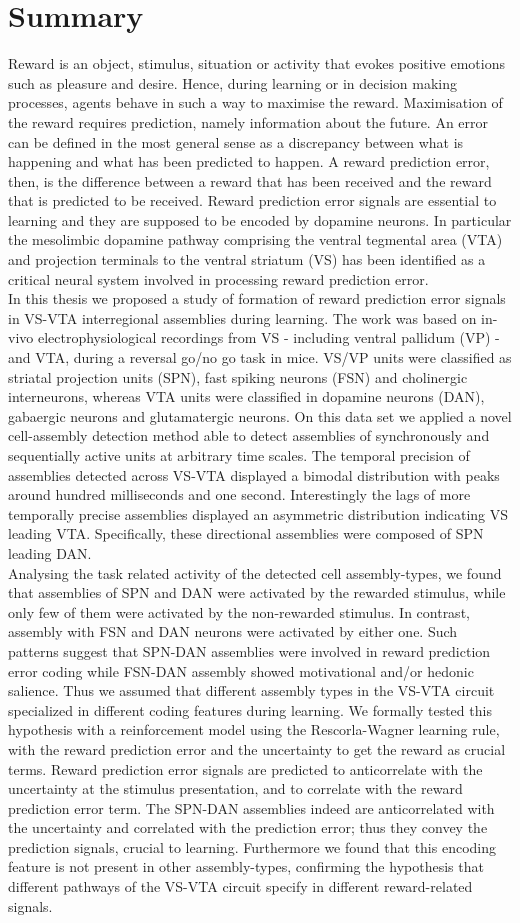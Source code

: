 \section*{Summary}
Reward is an object, stimulus, situation or activity that evokes positive emotions such as pleasure and desire. Hence, during learning or in decision making processes, agents behave in such a way to maximise the reward. Maximisation of the reward requires prediction, namely information about the future. An error can be defined in the most general sense as a discrepancy between what is happening and what has been predicted to happen. A reward prediction error, then, is the difference between a reward that has been received and the reward that is predicted to be received. Reward prediction error signals are essential to learning and they are supposed to be encoded by dopamine neurons. In particular the mesolimbic dopamine pathway comprising the ventral tegmental area (VTA) and projection terminals to the ventral striatum (VS) has been identified as a critical neural system involved in processing reward prediction error.\\In this thesis we proposed a study of formation of reward prediction error signals in VS-VTA interregional assemblies during learning. The work was based on in-vivo electrophysiological recordings from VS - including ventral pallidum (VP) - and VTA, during a reversal go/no go task in mice. VS/VP units were classified as striatal projection units (SPN), fast spiking neurons (FSN) and cholinergic interneurons, whereas VTA units were classified in dopamine neurons (DAN), gabaergic neurons and glutamatergic neurons. On this data set we applied a novel cell-assembly detection method able to detect assemblies of synchronously and sequentially active units at arbitrary time scales. The temporal precision of assemblies detected across VS-VTA displayed a bimodal distribution with peaks around hundred milliseconds and one second. Interestingly the lags of more temporally precise assemblies displayed an asymmetric distribution indicating VS leading VTA. Specifically, these directional assemblies were composed of SPN leading DAN.\\Analysing the task related activity of the detected cell assembly-types, we found that assemblies of SPN and DAN were activated by the rewarded stimulus, while only few of them were activated by the non-rewarded stimulus. In contrast, assembly with FSN and DAN neurons were activated by either one. Such patterns suggest that SPN-DAN assemblies were involved in reward prediction error coding while FSN-DAN assembly showed motivational and/or hedonic salience. Thus we assumed that different assembly types in the VS-VTA circuit specialized in different coding features during learning. We formally tested this hypothesis with a reinforcement model using the Rescorla-Wagner learning rule, with the reward prediction error and the uncertainty to get the reward as crucial terms. Reward prediction error signals are predicted to anticorrelate with the uncertainty at the stimulus presentation, and to correlate with the reward prediction error term. The SPN-DAN assemblies indeed are anticorrelated with the uncertainty and correlated with the prediction error; thus they convey the prediction signals, crucial to learning. Furthermore we found that this encoding feature is not present in other assembly-types, confirming the hypothesis that different pathways of the VS-VTA circuit specify in different reward-related signals.